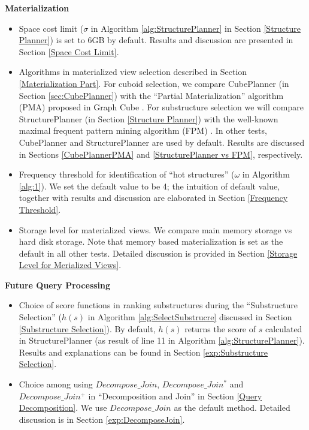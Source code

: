 \textbf{Materialization}
\begin{itemize}
	
	\item  Space cost limit ($\sigma$ in Algorithm \ref{alg:StructurePlanner} in Section \ref{Structure Planner}) is set to 6GB by default. Results and discussion are presented in Section \ref{Space Cost Limit}.
	
	\item  Algorithms in materialized view selection described in Section \ref{Materialization Part}. For cuboid selection, we compare CubePlanner (in Section \ref{sec:CubePlanner}) with the ``Partial Materialization'' algorithm (PMA) proposed in Graph Cube \cite{sigmod11_ZhaoLXH11}. For substructure selection we will compare StructurePlanner (in Section \ref{Structure Planner}) with the well-known maximal frequent pattern mining algorithm (FPM) \cite{DBLP:conf/icdm/GoudaZ01}. In other tests, CubePlanner and StructurePlanner are used by default. Results are discussed in Sections \ref{CubePlannerPMA} and \ref{StructurePlanner vs FPM}, respectively.
	
	\item Frequency threshold for identification of “hot structures” ($\omega$ in Algorithm \ref{alg:1}). We set the default value to be 4; the intuition of default value, together with results and discussion are elaborated in Section \ref{Frequency Threshold}.
	
	\item Storage level for materialized views. We  compare main memory storage vs hard disk storage. Note that memory based materialization is set as the default in all other tests. Detailed discussion is provided in Section \ref{Storage Level for Merialized Views}.
	
\end{itemize}

\textbf{Future Query Processing}
\begin{itemize}
	\item  Choice of score functions in ranking substructures during the  ``Substructure Selection'' ($h(s)$ in Algorithm \ref{alg:SelectSubstrucre} discussed in Section \ref{Substructure Selection}). By default, $h(s)$ returns the score of $s$ calculated in StructurePlanner (as result of line 11 in Algorithm \ref{alg:StructurePlanner}). Results and explanations can be found in Section \ref{exp:Substructure Selection}.
	
	\item  Choice among using $Decompose\_Join$, $Decompose\_Join^{*}$ and $Decompose\_Join^{+}$ in ``Decomposition and Join'' in Section \ref{Query Decomposition}. We use $Decompose\_Join$ as the default method. Detailed discussion is in Section \ref{exp:DecomposeJoin}.
	
\end{itemize}

